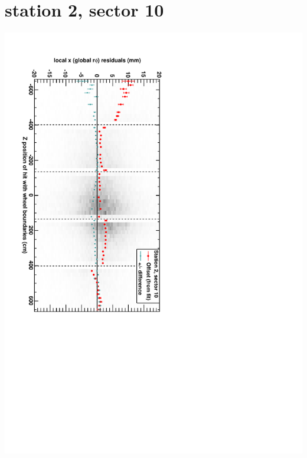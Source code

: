 \documentclass[compress]{beamer}
\begin{document}
\section*{station 2, sector 10}
\begin{frame} \vfill \mbox{\hspace{-1 cm}\includegraphics[height=1.2\linewidth, angle=90]{DTrphiVsZ_st2_sr10.pdf}} \end{frame}
\end{document}
